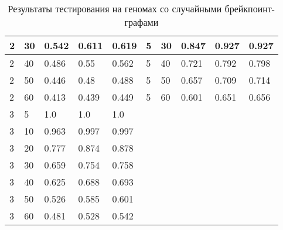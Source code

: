 \begin{table}[H]
\begin{tabular}{|l|l|l|l|l|lllll}
    2  & 30 & 0.542 & 0.611 & 0.619 & \multicolumn{1}{l|}{5}  & \multicolumn{1}{l|}{30} & \multicolumn{1}{l|}{0.847} & \multicolumn{1}{l|}{0.927} & \multicolumn{1}{l|}{0.927} \\ \hline
    2  & 40 & 0.486 & 0.55  & 0.562 & \multicolumn{1}{l|}{5}  & \multicolumn{1}{l|}{40} & \multicolumn{1}{l|}{0.721} & \multicolumn{1}{l|}{0.792} & \multicolumn{1}{l|}{0.798} \\ \hline
    2  & 50 & 0.446 & 0.48  & 0.488 & \multicolumn{1}{l|}{5}  & \multicolumn{1}{l|}{50} & \multicolumn{1}{l|}{0.657} & \multicolumn{1}{l|}{0.709} & \multicolumn{1}{l|}{0.714} \\ \hline
    2  & 60 & 0.413 & 0.439 & 0.449 & \multicolumn{1}{l|}{5}  & \multicolumn{1}{l|}{60} & \multicolumn{1}{l|}{0.601} & \multicolumn{1}{l|}{0.651} & \multicolumn{1}{l|}{0.656} \\ \hline
    3  & 5  & 1.0   & 1.0   & 1.0   &                         &                         &                            &                            &                            \\ \cline{1-5}
    3  & 10 & 0.963 & 0.997 & 0.997 &                         &                         &                            &                            &                            \\ \cline{1-5}
    3  & 20 & 0.777 & 0.874 & 0.878 &                         &                         &                            &                            &                            \\ \cline{1-5}
    3  & 30 & 0.659 & 0.754 & 0.758 &                         &                         &                            &                            &                            \\ \cline{1-5}
    3  & 40 & 0.625 & 0.688 & 0.693 &                         &                         &                            &                            &                            \\ \cline{1-5}
    3  & 50 & 0.526 & 0.585 & 0.601 &                         &                         &                            &                            &                            \\ \cline{1-5}
    3  & 60 & 0.481 & 0.528 & 0.542 &                         &                         &                            &                            &                            \\ \cline{1-5}
  \end{tabular}
  \caption{Результаты тестирования на геномах со случайными брейкпоинт-графами}
  \label{table:second_group}
\end{table}
